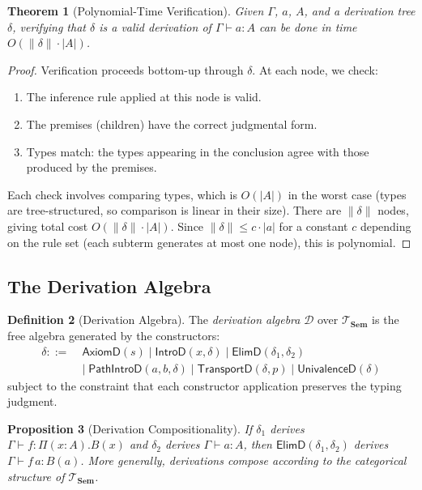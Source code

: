 \documentclass[11pt,a4paper]{article}
\theoremstyle{plain}
\newtheorem{theorem}{Theorem}[section]
\newtheorem{proposition}[theorem]{Proposition}
\theoremstyle{definition}
\newtheorem{definition}[theorem]{Definition}
\theoremstyle{remark}
\newcommand{\Sem}{\mathbf{Sem}}
\begin{document}
\begin{theorem}[Polynomial-Time Verification]\label{thm:poly-verify}
Given $\Gamma$, $a$, $A$, and a derivation tree $\delta$, verifying that $\delta$ is a valid derivation of $\Gamma \vdash a : A$ can be done in time $O(\|\delta\| \cdot |A|)$.
\end{theorem}

\begin{proof}
Verification proceeds bottom-up through $\delta$.
At each node, we check:
\begin{enumerate}[nosep]
  \item The inference rule applied at this node is valid.
  \item The premises (children) have the correct judgmental form.
  \item Types match: the types appearing in the conclusion agree with those produced by the premises.
\end{enumerate}
Each check involves comparing types, which is $O(|A|)$ in the worst case (types are tree-structured, so comparison is linear in their size).
There are $\|\delta\|$ nodes, giving total cost $O(\|\delta\| \cdot |A|)$.
Since $\|\delta\| \leq c \cdot |a|$ for a constant $c$ depending on the rule set (each subterm generates at most one node), this is polynomial.
\end{proof}

\subsection{The Derivation Algebra}

\begin{definition}[Derivation Algebra]\label{def:deriv-algebra}
The \emph{derivation algebra} $\mathcal{D}$ over $\mathcal{T}_{\Sem}$ is the free algebra generated by the constructors:
\begin{align*}
  \delta ::=\;& \mathsf{AxiomD}(s) \mid \mathsf{IntroD}(x, \delta) \mid \mathsf{ElimD}(\delta_1, \delta_2) \\
  &\mid\; \mathsf{PathIntroD}(a, b, \delta) \mid \mathsf{TransportD}(\delta, p) \mid \mathsf{UnivalenceD}(\delta)
\end{align*}
subject to the constraint that each constructor application preserves the typing judgment.
\end{definition}

\begin{proposition}[Derivation Compositionality]\label{prop:compositionality}
If $\delta_1$ derives $\Gamma \vdash f : \Pi(x:A).B(x)$ and $\delta_2$ derives $\Gamma \vdash a : A$, then $\mathsf{ElimD}(\delta_1, \delta_2)$ derives $\Gamma \vdash f\,a : B(a)$.
More generally, derivations compose according to the categorical structure of $\mathcal{T}_{\Sem}$.
\end{proposition}
\end{document}
